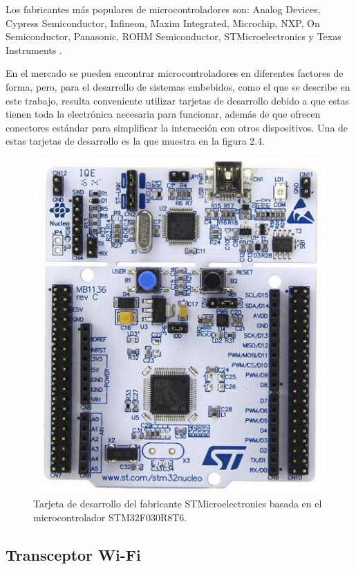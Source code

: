 Los fabricantes más populares de microcontroladores son: Analog Devices, Cypress Semiconductor, Infineon, Maxim Integrated, Microchip, NXP, On Semiconductor, Panasonic, ROHM Semiconductor, STMicroelectronics y Texas Instruments \citep{WEBSITE:12}.

En el mercado se pueden encontrar microcontroladores en diferentes factores de forma, pero, para el desarrollo de sistemas embebidos, como el que se describe en este trabajo, resulta conveniente utilizar tarjetas de desarrollo debido a que estas tienen toda la electrónica necesaria para funcionar, además de que ofrecen conectores estándar para simplificar la interacción con otros dispositivos. Una de estas tarjetas de desarrollo es la que muestra en la figura 2.4.

\begin{figure}[h]
	\centering
	\includegraphics[scale=0.45]{./Figures/microcontroller_dev.jpg}
	\caption{Tarjeta de desarrollo del fabricante STMicroelectronics basada en el microcontrolador STM32F030R8T6\protect\footnotemark.}
	\label{fig:microDevboard}
\end{figure}


\subsection{Transceptor Wi-Fi}

